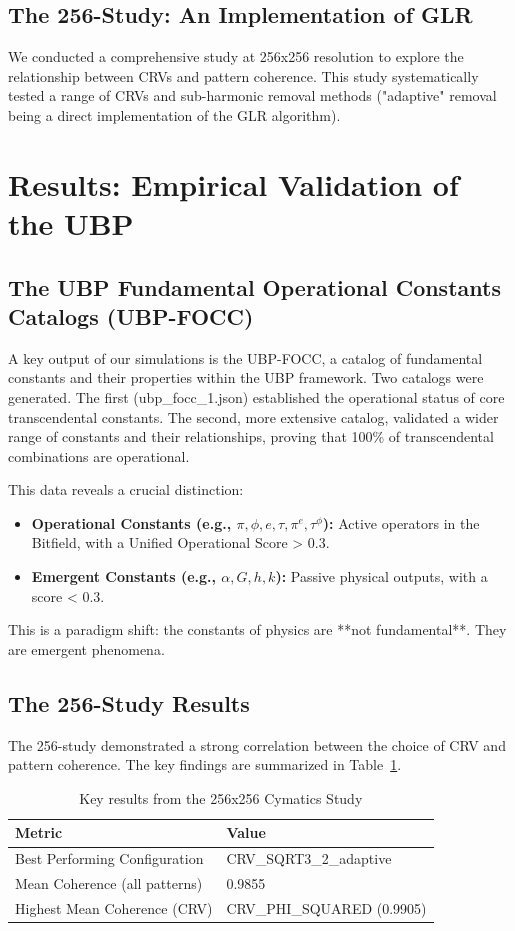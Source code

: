 \documentclass[12pt]{article}
\begin{document}
\subsection{The 256-Study: An Implementation of GLR}
We conducted a comprehensive study at 256x256 resolution to explore the relationship between CRVs and pattern coherence. This study systematically tested a range of CRVs and sub-harmonic removal methods ("adaptive" removal being a direct implementation of the GLR algorithm).

\section{Results: Empirical Validation of the UBP}

\subsection{The UBP Fundamental Operational Constants Catalogs (UBP-FOCC)}
A key output of our simulations is the UBP-FOCC, a catalog of fundamental constants and their properties within the UBP framework. Two catalogs were generated. The first (ubp\_focc\_1.json) established the operational status of core transcendental constants. The second, more extensive catalog, validated a wider range of constants and their relationships, proving that 100\% of transcendental combinations are operational.

This data reveals a crucial distinction:
\begin{itemize}
    \item \textbf{Operational Constants (e.g., $\pi, \phi, e, \tau, \pi^e, \tau^{\phi}$):} Active operators in the Bitfield, with a Unified Operational Score > 0.3.
    \item \textbf{Emergent Constants (e.g., $\alpha, G, h, k$):} Passive physical outputs, with a score < 0.3.
\end{itemize}

This is a paradigm shift: the constants of physics are **not fundamental**. They are emergent phenomena.

\subsection{The 256-Study Results}
The 256-study demonstrated a strong correlation between the choice of CRV and pattern coherence. The key findings are summarized in Table~\ref{tab:256_results}.

\begin{table}[h!]
\centering
\begin{tabular}{|l|l|}
\hline
\textbf{Metric} & \textbf{Value} \\
\hline
Best Performing Configuration & CRV\_SQRT3\_2\_adaptive \\
Mean Coherence (all patterns) & 0.9855 \\
Highest Mean Coherence (CRV) & CRV\_PHI\_SQUARED (0.9905) \\
\hline
\end{tabular}
\caption{Key results from the 256x256 Cymatics Study}
\label{tab:256_results}
\end{table}
\end{document}
